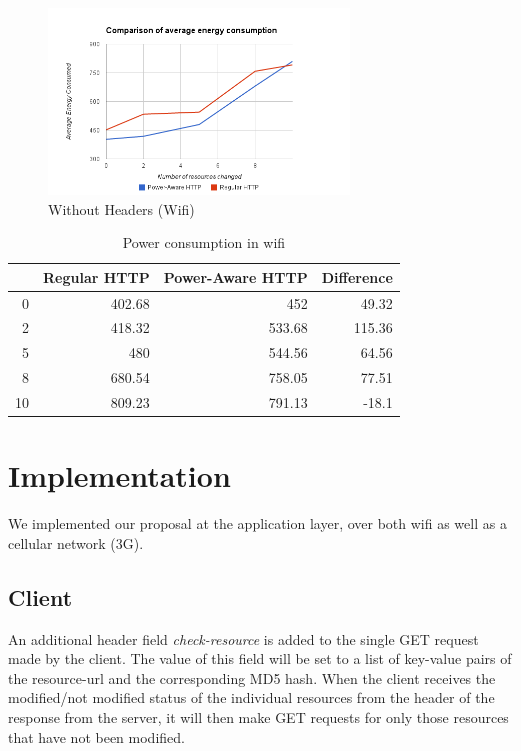 \documentclass{sigplanconf}
\begin{document}
\begin{figure}[ht!]
\centering
\includegraphics[width=80mm]{avg_energy_wifi.png}
\caption{Without Headers (Wifi) }
\label{fig:sp_gd_mnist}
\end{figure}

\begin{table}[htbp]
\caption{Power consumption in wifi}
\begin{tabular}{|r|r|r|r|}
\hline
\multicolumn{1}{|l|}{} & \multicolumn{1}{l|}{Regular HTTP} & \multicolumn{1}{l|}{Power-Aware HTTP} & \multicolumn{1}{l|}{Difference} \\ \hline
0 & 402.68 & 452 & 49.32 \\ \hline
2 & 418.32 & 533.68 & 115.36 \\ \hline
5 & 480 & 544.56 & 64.56 \\ \hline
8 & 680.54 & 758.05 & 77.51 \\ \hline
10 & 809.23 & 791.13 & -18.1 \\ \hline
\end{tabular}
\label{}
\end{table}



\section{Implementation}

We implemented our proposal at the application layer, over both wifi as well as a cellular network (3G).

\subsection{Client}

An additional header field {\it check-resource} is added to the single GET request made by the client. 
The value of this field will be set to a list of key-value pairs of the resource-url and the corresponding MD5 hash.  When the client receives the modified/not modified status of the individual resources from the header of the response from the server, it will then make GET requests for only those resources that have not been modified.
\end{document}
